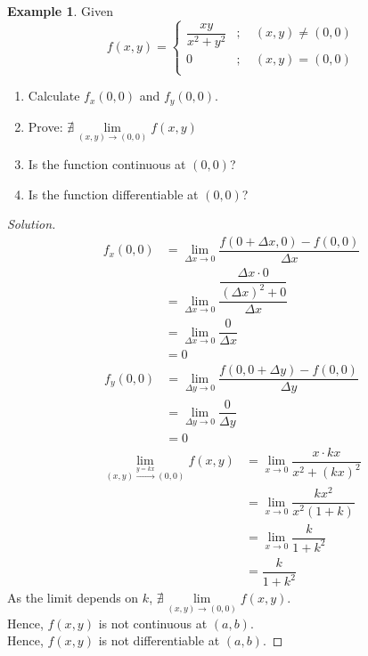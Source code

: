 \documentclass[fleqn, a4paper, 12pt]{article}
\theoremstyle{definition}
\newtheorem{example}{Example}
\theoremstyle{theorem}
\theoremstyle{remark}
\newenvironment{solution}
{\begin{proof}[Solution]\let\qed\relax}
	{\end{proof}}
\begin{document}
\begin{example}
	Given
	\begin{equation*}
		f(x, y) = 
		\begin{cases}
			\dfrac{xy}{x^2 + y^2} &;\quad (x, y) \neq (0,0)\\
			0 &;\quad (x,y) = (0,0)\\
		\end{cases}
	\end{equation*}
	\begin{enumerate}
		\item Calculate $f_x(0,0)$ and $f_y(0,0)$.
		\item Prove: $\nexists \lim\limits_{(x, y) \to (0, 0)} f(x, y)$
		\item Is the function continuous at $(0, 0)$?
		\item Is the function differentiable at $(0, 0)$?
	\end{enumerate}
\end{example}

\begin{solution}
	\begin{align*}
		f_x(0, 0) &= \lim\limits_{\Delta x \to 0} \dfrac{f(0 + \Delta x, 0) - f(0, 0)}{\Delta x}\\
		&= \lim\limits_{\Delta x \to 0} \dfrac{\dfrac{\Delta x \cdot 0}{(\Delta x)^2 + 0}}{\Delta x}\\
		&= \lim\limits_{\Delta x \to 0} \dfrac{0}{\Delta x}\\
		&= 0
	\end{align*}
	\begin{align*}
		f_y(0, 0) &= \lim\limits_{\Delta y \to 0} \dfrac{f(0, 0 + \Delta y) - f(0, 0)}{\Delta y}\\
		&= \lim\limits_{\Delta y \to 0} \dfrac{0}{\Delta y}\\
		&= 0
	\end{align*}
	\begin{align*}
		\lim\limits_{(x, y) \stackrel{y = kx}{\to} (0, 0)} f(x, y) &= \lim\limits_{x \to 0} \dfrac{x \cdot kx}{x^2 + (kx)^2}\\
		&= \lim\limits_{x \to 0} \dfrac{k x^2}{x^2 (1 + k)}\\
		&= \lim\limits_{x \to 0} \dfrac{k}{1 + k^2} \\
		&= \dfrac{k}{1 + k^2}
	\end{align*}
	As the limit depends on $k$, $\nexists \lim\limits_{(x, y) \to (0, 0)} f(x, y)$.\\
	Hence, $f(x, y)$ is not continuous at $(a, b)$.\\
	Hence, $f(x, y)$ is not differentiable at $(a, b)$.
\end{solution}
\end{document}
